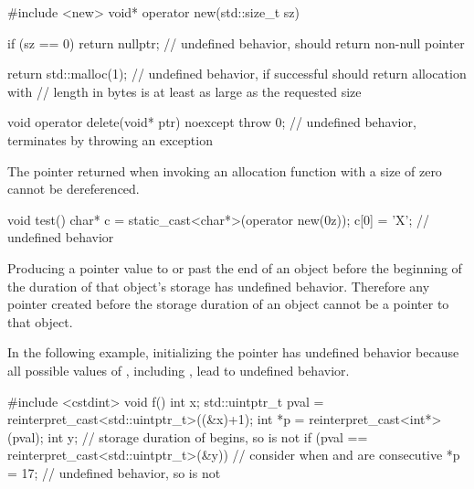 \pnum
\begin{example}
\begin{codeblock}
#include <new>
void* operator new(std::size_t sz) {
  if (sz == 0)
    return nullptr;             // undefined behavior, should return non-null pointer

  return std::malloc(1);        // undefined behavior, if successful should return allocation with
                                // length in bytes is at least as large as the requested size
}
void operator delete(void* ptr) noexcept {
  throw 0;                      // undefined behavior, terminates by throwing an exception
}
\end{codeblock}
\end{example}


\pnum
The pointer returned when invoking an allocation function with a size of zero
cannot be dereferenced.

\pnum
\begin{example}
\begin{codeblock}
void test()
{
    char* c = static_cast<char*>(operator new(0z));
    c[0] = 'X';     // undefined behavior
}
\end{codeblock}
\end{example}


\pnum
Producing a pointer value
to or past the end of an object
before the beginning of the
duration of that object's storage
has undefined behavior.
Therefore
any pointer created
before the storage duration
of an object
cannot be a pointer
to that object.

\pnum
\begin{example}
In the following example,
initializing the pointer 
has undefined behavior
because all possible values of ,
including ,
lead to undefined behavior.
\begin{codeblock}
#include <cstdint>
void f() {
  int x;
  std::uintptr_t pval = reinterpret_cast<std::uintptr_t>((&x)+1);
  int *p = reinterpret_cast<int*>(pval);
  {
    int y;          // storage duration of  begins, so  is not 
    if (pval == reinterpret_cast<std::uintptr_t>(&y)) { // consider when  and  are consecutive
      *p = 17;      // undefined behavior, so  is not 
    }
  }
}
\end{codeblock}
\end{example}

